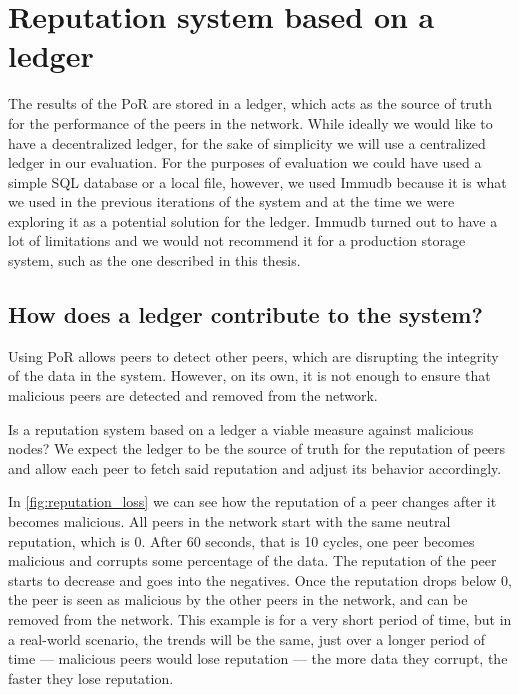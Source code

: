 
\section{Reputation system based on a ledger}

The results of the PoR are stored in a ledger, which acts as the source of truth for
the performance of the peers in the network.
While ideally we would like to have a decentralized ledger, for the sake of simplicity
we will use a centralized ledger in our evaluation.
For the purposes of evaluation we could have used a simple SQL database or a local file,
however, we used Immudb because it is what we used in the previous iterations of the system
and at the time we were exploring it as a potential solution for the ledger.
Immudb turned out to have a lot of limitations and we would not recommend it for a production storage system,
such as the one described in this thesis.

\subsection{How does a ledger contribute to the system?}

Using PoR allows peers to detect other peers, which are disrupting the integrity of the data in the system.
However, on its own, it is not enough to ensure that malicious peers are detected and removed from the network.

Is a reputation system based on a ledger a viable measure against malicious nodes?
We expect the ledger to be the source of truth for the reputation of peers and allow
each peer to fetch said reputation and adjust its behavior accordingly.

In \autoref{fig:reputation_loss} we can see how the reputation of a peer changes after it becomes malicious.
All peers in the network start with the same neutral reputation, which is 0.
After 60 seconds, that is 10 cycles, one peer becomes malicious and corrupts some percentage of the data.
The reputation of the peer starts to decrease and goes into the negatives.
Once the reputation drops below 0, the peer is seen as malicious by the other peers in the network,
and can be removed from the network.
This example is for a very short period of time, but in a real-world scenario, the trends will be the same,
just over a longer period of time --- malicious peers would lose reputation --- the more data they corrupt,
the faster they lose reputation.


